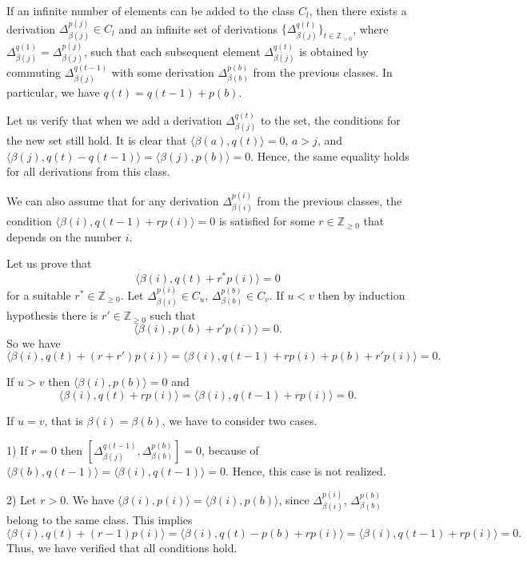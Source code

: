 \documentclass[a4paper, 12pt,oneside,reqno]{amsart}
\numberwithin{equation}{section}
\theoremstyle{definition}
\begin{document}
If an infinite number of elements can be added to the class $C_l$, then there exists a derivation $\Delta^{p(j)}_{\beta(j)}\in C_l$ and an infinite set of derivations $\{\Delta^{q(t)}_{\beta(j)}\}_{t\in\mathbb{Z}_{>0}}$, where $\Delta^{q(1)}_{\beta(j)}=\Delta^{p(j)}_{\beta(j)}$, such that each subsequent element $\Delta^{q(t)}_{\beta(j)}$ is obtained by commuting $\Delta^{q(t-1)}_{\beta(j)}$ with some derivation $\Delta^{p(b)}_{\beta(b)}$ from the previous classes. In particular, we have $q(t)=q(t-1)+p(b)$. 

Let us verify that when we add a derivation $\Delta^{q(t)}_{\beta(j)}$ to the set, the conditions for the new set still hold. It is clear that $\langle\beta(a),q(t)\rangle=0$, $a>j$, and  $\langle\beta(j),q(t)-q(t-1)\rangle=\langle\beta(j),p(b)\rangle=0$. Hence, the same equality holds for all derivations from this class. 

We can also assume that for any derivation $\Delta^{p(i)}_{\beta(i)}$ from the previous classes, the condition $\langle\beta(i),q(t-1)+rp(i)\rangle=0$ is satisfied for some $r\in\mathbb{Z}_{\ge 0}$ that depends on the number $i$.

Let us prove that 
$$
\langle\beta(i),q(t)+r^*p(i)\rangle=0
$$ 
for a suitable $r^*\in\mathbb{Z}_{\ge 0}$. Let $\Delta^{p(i)}_{\beta(i)} \in C_u$, $\Delta^{p(b)}_{\beta(b)} \in C_v.$ If $u<v$ then by induction hypothesis there is $r'\in\mathbb{Z}_{\ge 0}$ such that 
$$
\langle\beta(i),p(b)+r'p(i)\rangle=0.
$$ 
So we have
$$
\langle\beta(i),q(t)+(r+r')p(i)\rangle=\langle\beta(i),q(t-1)+rp(i)+p(b)+r'p(i)\rangle=0.
$$

If $u>v$ then $\langle\beta(i),p(b)\rangle=0$ and 
$$
\langle\beta(i),q(t)+rp(i)\rangle=\langle\beta(i),q(t-1)+rp(i)\rangle=0.
$$

If $u=v$, that is $\beta(i)=\beta(b)$, we have to consider two cases. 

\smallskip

1) If $r=0$ then $[\Delta^{q(t-1)}_{\beta(j)},\Delta^{p(b)}_{\beta(b)}]=0$, because of $\langle\beta(b),q(t-1)\rangle=\langle\beta(i),q(t-1)\rangle=0$. Hence, this case is not realized. 

\smallskip

2) Let $r>0$. We have $\langle\beta(i),p(i)\rangle=\langle\beta(i),p(b)\rangle$, since $\Delta^{p(i)}_{\beta(i)}$, $\Delta^{p(b)}_{\beta(b)}$ belong to the same class. 
This implies
$$
\langle\beta(i),q(t)+(r-1)p(i)\rangle=\langle\beta(i),q(t)-p(b)+rp(i)\rangle=\langle\beta(i),q(t-1)+rp(i)\rangle=0.  
$$
Thus, we have verified that all conditions hold. 
\end{document}
